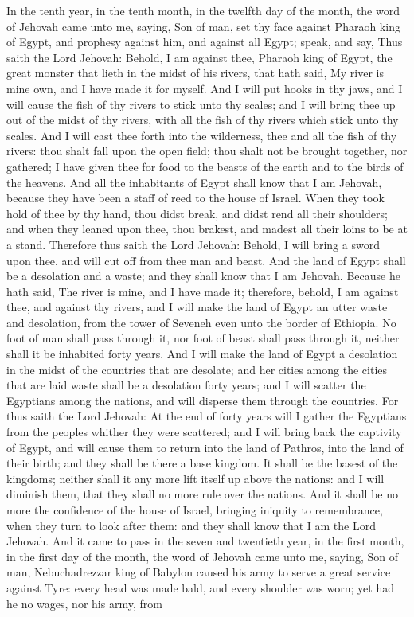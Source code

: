 In the tenth year, in the tenth month, in the twelfth day of the month, the word of Jehovah came unto me, saying, Son of man, set thy face against Pharaoh king of Egypt, and prophesy against him, and against all Egypt; speak, and say, Thus saith the Lord Jehovah: Behold, I am against thee, Pharaoh king of Egypt, the great monster that lieth in the midst of his rivers, that hath said, My river is mine own, and I have made it for myself. And I will put hooks in thy jaws, and I will cause the fish of thy rivers to stick unto thy scales; and I will bring thee up out of the midst of thy rivers, with all the fish of thy rivers which stick unto thy scales. And I will cast thee forth into the wilderness, thee and all the fish of thy rivers: thou shalt fall upon the open field; thou shalt not be brought together, nor gathered; I have given thee for food to the beasts of the earth and to the birds of the heavens. And all the inhabitants of Egypt shall know that I am Jehovah, because they have been a staff of reed to the house of Israel. When they took hold of thee by thy hand, thou didst break, and didst rend all their shoulders; and when they leaned upon thee, thou brakest, and madest all their loins to be at a stand.  Therefore thus saith the Lord Jehovah: Behold, I will bring a sword upon thee, and will cut off from thee man and beast. And the land of Egypt shall be a desolation and a waste; and they shall know that I am Jehovah. Because he hath said, The river is mine, and I have made it; therefore, behold, I am against thee, and against thy rivers, and I will make the land of Egypt an utter waste and desolation, from the tower of Seveneh even unto the border of Ethiopia. No foot of man shall pass through it, nor foot of beast shall pass through it, neither shall it be inhabited forty years. And I will make the land of Egypt a desolation in the midst of the countries that are desolate; and her cities among the cities that are laid waste shall be a desolation forty years; and I will scatter the Egyptians among the nations, and will disperse them through the countries.  For thus saith the Lord Jehovah: At the end of forty years will I gather the Egyptians from the peoples whither they were scattered; and I will bring back the captivity of Egypt, and will cause them to return into the land of Pathros, into the land of their birth; and they shall be there a base kingdom. It shall be the basest of the kingdoms; neither shall it any more lift itself up above the nations: and I will diminish them, that they shall no more rule over the nations. And it shall be no more the confidence of the house of Israel, bringing iniquity to remembrance, when they turn to look after them: and they shall know that I am the Lord Jehovah.  And it came to pass in the seven and twentieth year, in the first month, in the first day of the month, the word of Jehovah came unto me, saying, Son of man, Nebuchadrezzar king of Babylon caused his army to serve a great service against Tyre: every head was made bald, and every shoulder was worn; yet had he no wages, nor his army, from 